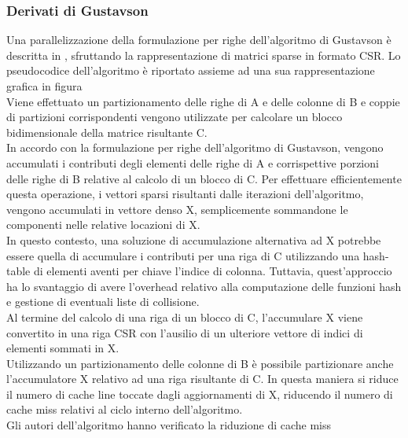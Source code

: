 \subsubsection{Derivati di Gustavson} \label{ssec:gustavsonDerivate}
Una parallelizzazione della formulazione per righe dell'algoritmo di Gustavson è
descritta in , sfruttando la
rappresentazione di matrici sparse in formato CSR.  \label{ssec:intelSpMMDenseAccumulator}
Lo pseudocodice dell'algoritmo è riportato assieme ad una sua rappresentazione grafica 
in figura \\
Viene effettuato un partizionamento delle righe di A e delle colonne di B e 
coppie di partizioni corrispondenti vengono utilizzate per calcolare un
blocco bidimensionale della matrice risultante C.\\
\voidLine
In accordo con la formulazione per righe dell'algoritmo di Gustavson, vengono
accumulati i contributi degli elementi \nnz delle righe di A e corrispettive porzioni
delle righe di B relative al calcolo di un blocco di C. 
Per effettuare efficientemente questa operazione, i vettori sparsi risultanti
dalle iterazioni dell'algoritmo, vengono accumulati in vettore denso X, 
semplicemente sommandone le componenti \nnz nelle relative locazioni di X.\\
\voidLine
In questo contesto, una soluzione di accumulazione alternativa ad X
potrebbe essere quella di accumulare i contributi per una riga di C 
utilizzando una hash-table di elementi aventi per chiave l'indice di colonna. 
Tuttavia, quest'approccio ha lo svantaggio di avere l'overhead relativo alla 
computazione delle funzioni hash e gestione di eventuali liste di collisione.\\
Al termine del calcolo di una riga di un blocco di C, l'accumulare X viene
convertito in una riga CSR con l'ausilio di un ulteriore vettore di indici di
elementi \nnz sommati in X.\\
\voidLine
Utilizzando un partizionamento delle colonne di B è possibile partizionare anche
l'accumulatore X relativo ad una riga risultante di C. In questa maniera si
riduce il numero di cache line toccate dagli aggiornamenti di X, riducendo il
numero di cache miss relativi al ciclo interno dell'algoritmo.\\
Gli autori dell'algoritmo hanno verificato la riduzione di cache miss
